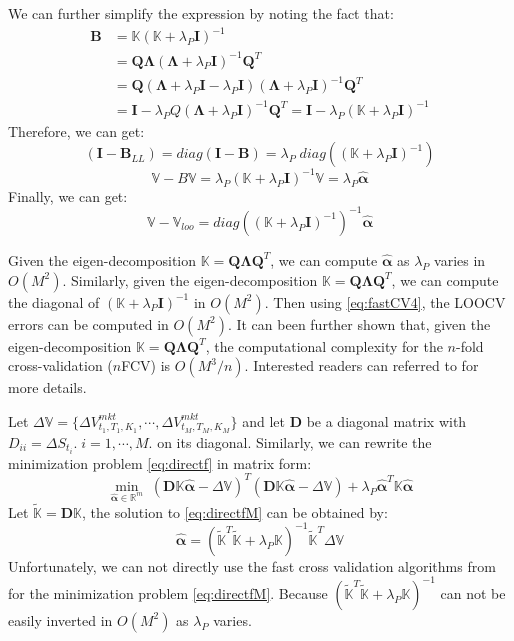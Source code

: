 \documentclass[letterpaper,12pt,titlepage,oneside,final]{book}
\numberwithin{equation}{section}
\theoremstyle{definition}
\newcommand{\Real}{\mathbb{R}}
\newcommand{\valpha}{\pmb{\widehat{\alpha}}}
\newcommand{\vK}{\mathbb{K}}
\newcommand{\Vmkt}{V^{mkt}}
\newcommand{\vecVmkt}{\mathbb{V}}
\begin{document}
We can further simplify the expression by noting the fact that:
\[\begin{split}
\pmb{B}&=\vK (\vK+\lambda_P \pmb{I})^{-1} \\
       &=\pmb{Q}\pmb{\Lambda}(\pmb{\Lambda}+\lambda_P \pmb{I})^{-1} \pmb{Q}^T\\
       &=\pmb{Q}(\pmb{\Lambda}+\lambda_P \pmb{I}-\lambda_P \pmb{I})(\pmb{\Lambda}+\lambda_P \pmb{I})^{-1} \pmb{Q}^T\\
       &= \pmb{I}-\lambda_P Q (\pmb{\Lambda}+\lambda_P \pmb{I})^{-1} \pmb{Q}^T=\pmb{I} -\lambda_P  (\vK+\lambda_P \pmb{I})^{-1}
  \end{split}
\]
Therefore, we can get:
\[
(\pmb{I}-\pmb{B}_{LL})=diag(\pmb{I}-\pmb{B})=\lambda_P \; diag((\vK+\lambda_P \pmb{I})^{-1})
\]
\[
\vecVmkt-B\vecVmkt=\lambda_P (\vK+\lambda_P \pmb{I})^{-1} \vecVmkt =\lambda_P \valpha
\]
Finally, we can get:
\begin{equation}  \label{eq:fastCV4}
\vecVmkt-\vecVmkt_{loo}=diag((\vK+\lambda_P \pmb{I})^{-1})^{-1} \valpha
\end{equation}

Given the eigen-decomposition $\vK=\pmb{Q} \pmb{\Lambda} \pmb{Q}^T$, we can compute  $\valpha$ as $\lambda_P$ varies in $O(M^2)$. Similarly, given the eigen-decomposition $\vK=\pmb{Q} \pmb{\Lambda} \pmb{Q}^T$, we can compute the diagonal of $(\vK+\lambda_P \pmb{I})^{-1}$ in $O(M^2)$. Then  using \eqref{eq:fastCV4}, the LOOCV errors can be computed in $O(M^2)$.  It can been further shown \cite{pahikkala2006fast} that, given the eigen-decomposition $\vK=\pmb{Q} \pmb{\Lambda} \pmb{Q}^T$, the computational complexity for the $n$-fold cross-validation ($n$FCV) is $O(M^3/n)$. Interested readers can referred to \citep{pahikkala2006fast, wahba1990spline} for more details.

Let $\Delta \vecVmkt=\{\Delta \Vmkt_{t_1,T_1,K_1},\cdots,\Delta \Vmkt_{t_M,T_M,K_M}\}$ and  let $\pmb{D}$ be a diagonal matrix with $D_{ii}=\Delta S_{t_i}. \;i=1,\cdots,M.$ on its diagonal.
Similarly, we can rewrite  the minimization problem \eqref{eq:directf} in matrix form:
\begin{equation}
\min_{\valpha \in \Real^m} \; ( \pmb{D} \vK \valpha - \Delta \vecVmkt)^T (\pmb{D}  \vK \valpha -\Delta \vecVmkt)+ \lambda_P \valpha^T\vK\valpha
\label{eq:directfM}
\end{equation}
Let $\widetilde{\vK}=\pmb{D}\vK$, the solution to \eqref{eq:directfM} can be obtained by:
\[
\valpha = (\widetilde{\vK}^T\widetilde{\vK}  + \lambda_P \vK)^{-1} \widetilde{\vK}^T \Delta \vecVmkt
\]
Unfortunately, we can not directly use the fast cross validation algorithms from \cite{pahikkala2006fast, wahba1990spline} for the minimization problem \eqref{eq:directfM}.
Because $(\pmb{\widetilde{\vK}}^T\pmb{\widetilde{\vK}}  + \lambda_P \vK)^{-1}$ can not be easily inverted in $O(M^2)$ as $\lambda_P$ varies.
\end{document}
